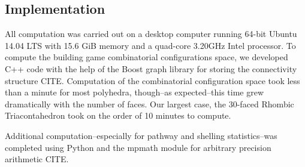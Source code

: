\subsection{Implementation}
All computation was carried out on a desktop computer running 64-bit Ubuntu 14.04 LTS with 15.6 GiB memory and a quad-core 3.20GHz Intel processor. To compute the building game combinatorial configurations space, we developed C++ code with the help of the Boost graph library for storing the connectivity structure CITE. Computation of the combinatorial configuration space took less than a minute for most polyhedra, though--as expected--this time grew dramatically with the number of faces. Our largest case, the 30-faced Rhombic Triacontahedron took on the order of 10 minutes to compute. 

Additional computation--especially for pathway and shelling statistics--was completed using Python and the mpmath module for arbitrary precision arithmetic CITE. 
